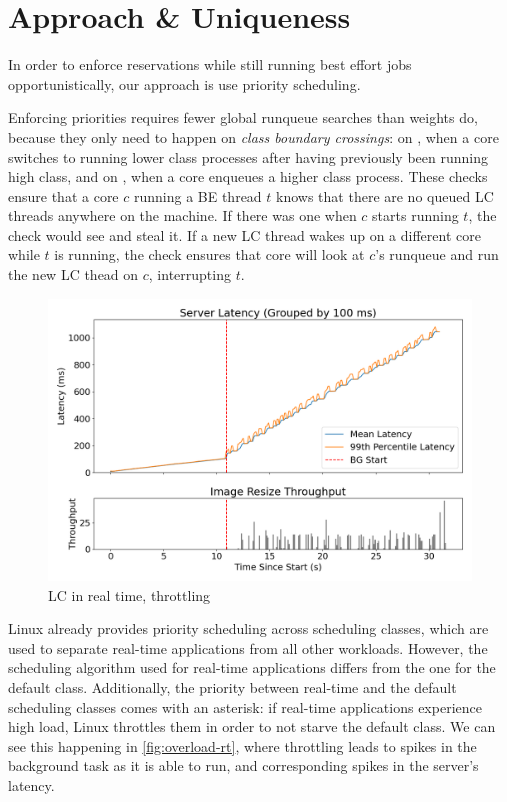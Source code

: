 \section{Approach \& Uniqueness}

In order to enforce reservations while still running best effort jobs
opportunistically, our approach is use priority scheduling.

Enforcing priorities requires fewer global runqueue searches than weights do,
because they only need to happen on \textit{class boundary crossings}: on
\exit{}, when a core switches to running lower class processes after having
previously been running high class, and on \entry{}, when a core enqueues a
higher class process. These checks ensure that a core $c$ running a BE thread
$t$ knows that there are no queued LC threads anywhere on the machine. If there
was one when $c$ starts running $t$, the \exit{} check would see and steal it.
If a new LC thread wakes up on a different core while $t$ is running, the
\entry{} check ensures that core will look at $c$'s runqueue and run the new LC
thead on $c$, interrupting $t$.

\begin{figure}[t]
    \centering
    \includegraphics[width=\columnwidth]{graphs/overload-rt.png}
    \caption{LC in real time, throttling}\label{fig:overload-rt}
\end{figure}


Linux already provides priority scheduling across scheduling classes, which are
used to separate real-time applications from all other workloads. However, the
scheduling algorithm used for real-time applications differs from the one for
the default class. Additionally, the priority between real-time and the default
scheduling classes comes with an asterisk: if real-time applications experience
high load, Linux throttles them in order to not starve the default class. We can
see this happening in \autoref{fig:overload-rt}, where throttling leads to
spikes in the background task as it is able to run, and corresponding spikes in
the server's latency.

